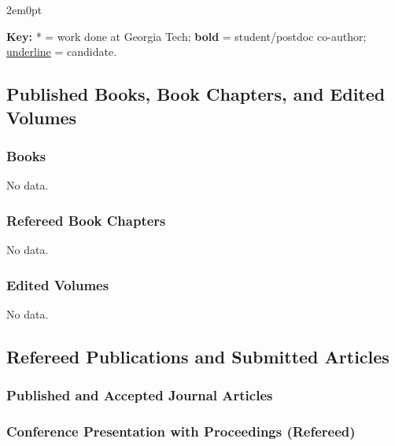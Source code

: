 \documentclass[11pt]{article}
\begin{document}
\begin{adjustwidth}{2em}{0pt}

\textbf{Key:} * = work done at Georgia Tech; \textbf{bold} = student/postdoc co-author; \underline{underline} = candidate.

\subsection{Published Books, Book Chapters, and Edited Volumes}

\subsubsection{Books}
No data.

\subsubsection{Refereed Book Chapters}
No data.

\subsubsection{Edited Volumes}
No data.

\subsection{Refereed Publications and Submitted Articles}

\nocite{*}

\subsubsection{Published and Accepted Journal Articles}

\newrefcontext[labelprefix=J]
\printbibliography[type=article,resetnumbers=true,heading=none]

\subsubsection{Conference Presentation with Proceedings (Refereed)}

\newrefcontext[labelprefix=P]
\printbibliography[type=inproceedings,resetnumbers=true,heading=none]


\end{adjustwidth}
\end{document}
